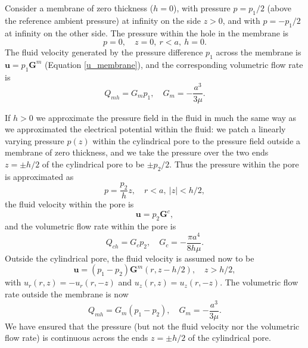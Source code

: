Consider a membrane of zero thickness ($h=0$), with pressure $p=p_1/2$
(above the reference ambient pressure)
at infinity on the side $z>0$, and with $p=-p_1/2$ at infinity on
the other side. The pressure within the hole in the membrane is
\begin{equation}
p=0,\quad z=0,\ r<a,\ h=0.
\end{equation}
The fluid velocity generated by the pressure difference $p_1$
across the membrane is
$\mathbf{u}=p_1\mathbf{G}^m$ (Equation \ref{u_membrane}),
and the corresponding volumetric flow rate is \cite{Happel&Brenner} %
\begin{equation}
Q_{mh}=G_mp_1,\quad G_m=-\frac{a^3}{3\mu}.
\end{equation}

If $h>0$ we approximate the pressure field in the fluid in much the same way as
we approximated the electrical potential within the fluid:
we patch a linearly varying pressure $p(z)$ within the
cylindrical pore to the pressure field outside a membrane of zero thickness,
and we take the pressure over the two ends $z=\pm h/2$ of the cylindrical
pore to be $\pm p_2/2$.
Thus the pressure within the pore is approximated as
\begin{equation}
p=\frac{p_2}{h}z,\quad r<a,\ |z|<h/2,
\end{equation}
the fluid velocity within the pore is
\begin{equation}
\mathbf{u}=p_2\mathbf{G}^c,
\label{u_c}
\end{equation}
and the volumetric flow rate within the pore is
\begin{equation}
Q_{ch}=G_cp_2,\quad G_c=-\frac{\pi a^4}{8h\mu}.
\label{G_c}
\end{equation}
Outside the cylindrical pore, the fluid velocity is assumed now to be
\begin{equation}
\mathbf{u}=(p_1-p_2)\mathbf{G}^m(r,z-h/2),\quad z>h/2,
\label{u_m}
\end{equation}
with $u_r(r,z)=-u_r(r,-z)$ and $u_z(r,z)=u_z(r,-z)$. 
The volumetric flow rate outside the membrane is now
\begin{equation}
Q_{mh}=G_m(p_1-p_2),\quad G_m=-\frac{a^3}{3\mu}.
\label{G_m}
\end{equation}
We have
ensured that the pressure (but not the fluid
velocity nor the volumetric flow rate) is continuous across the ends
$z=\pm h/2$ of
the cylindrical pore.


